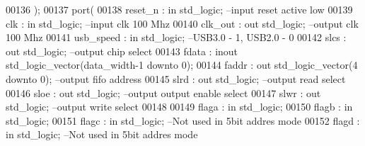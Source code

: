 \begin{DoxyCode}
00136                 );
00137     \textcolor{keywordflow}{port}(
00138         reset_n                     : \textcolor{keywordflow}{in} \textcolor{comment}{std\_logic};                                 \textcolor{keyword}{--input reset active
       low}
00139         clk                 : \textcolor{keywordflow}{in} \textcolor{comment}{std\_logic};                                 \textcolor{keyword}{--input clk 100 Mhz  }
00140         clk_out             : \textcolor{keywordflow}{out} \textcolor{comment}{std\_logic};                                    \textcolor{keyword}{--output clk 100 Mhz }
00141         usb_speed               : \textcolor{keywordflow}{in} \textcolor{comment}{std\_logic};                                 \textcolor{keyword}{--USB3.0 - 1, USB2.0 - 0}
00142         slcs                    : \textcolor{keywordflow}{out} \textcolor{comment}{std\_logic};                                    \textcolor{keyword}{--output chip select}
00143         fdata                   : \textcolor{keywordflow}{inout} \textcolor{comment}{std\_logic\_vector}(data_width\textcolor{vhdlchar}{-}\textcolor{vhdllogic}{}\textcolor{vhdllogic}{1} \textcolor{keywordflow}{downto} \textcolor{vhdllogic}{}\textcolor{vhdllogic}{0});         
00144         faddr                   : \textcolor{keywordflow}{out} \textcolor{comment}{std\_logic\_vector}(\textcolor{vhdllogic}{}\textcolor{vhdllogic}{4} \textcolor{keywordflow}{downto} \textcolor{vhdllogic}{}\textcolor{vhdllogic}{0});         \textcolor{keyword}{--output fifo address}
00145         slrd                    : \textcolor{keywordflow}{out} \textcolor{comment}{std\_logic};                                    \textcolor{keyword}{--output read select}
00146         sloe                    : \textcolor{keywordflow}{out} \textcolor{comment}{std\_logic};                                    \textcolor{keyword}{--output output enable
       select}
00147         slwr                    : \textcolor{keywordflow}{out} \textcolor{comment}{std\_logic};                                    \textcolor{keyword}{--output write select}
00148                     
00149       flaga                 : \textcolor{keywordflow}{in} \textcolor{comment}{std\_logic};                                
00150         flagb                   : \textcolor{keywordflow}{in} \textcolor{comment}{std\_logic};
00151       flagc                 : \textcolor{keywordflow}{in} \textcolor{comment}{std\_logic};                                 \textcolor{keyword}{--Not used in 5bit addres mode}
00152       flagd                 : \textcolor{keywordflow}{in} \textcolor{comment}{std\_logic};                                 \textcolor{keyword}{--Not used in 5bit addres mode}

\end{DoxyCode}
